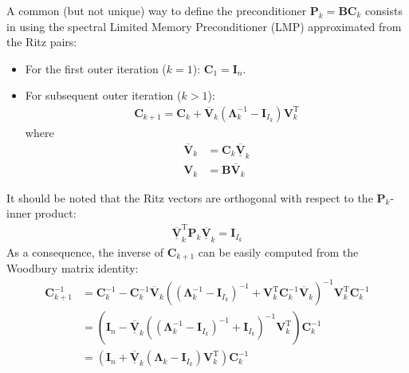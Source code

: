 \documentclass[12pt]{scrartcl}
\begin{document}
A common (but not unique) way to define the preconditioner $\mathbf{P}_k = \mathbf{B}\mathbf{C}_k$ consists in using the spectral Limited Memory Preconditioner (LMP) approximated from the Ritz pairs:
\begin{itemize}
\item For the first outer iteration ($k=1$): $\mathbf{C}_1 = \mathbf{I}_n$.
\item For subsequent outer iteration ($k>1$):
\begin{align}
\mathbf{C}_{k+1} = \mathbf{C}_k + \overline{\mathbf{V}}_k \left(\mathbf{\Lambda}_k^{-1} - \mathbf{I}_{I_k}\right) \mathbf{V}_k^\mathrm{T}
\end{align}
where
\begin{align}
\overline{\mathbf{V}}_k & = \mathbf{C}_k \underline{\overline{\mathbf{V}}}_k \\
\mathbf{V}_k & = \mathbf{B} \overline{\mathbf{V}}_k
\end{align}
\end{itemize}
It should be noted that the Ritz vectors are orthogonal with respect to the $\mathbf{P}_k$-inner product:
\begin{align}
\underline{\overline{\mathbf{V}}}_k^\mathrm{T} \mathbf{P}_k \underline{\overline{\mathbf{V}}}_k = \mathbf{I}_{I_k}
\end{align}
As a consequence, the inverse of $\mathbf{C}_{k+1}$ can be easily computed from the Woodbury matrix identity:
\begin{align}
\mathbf{C}_{k+1}^{-1} & = \mathbf{C}_k^{-1} - \mathbf{C}_k^{-1} \overline{\mathbf{V}}_k \left(\left(\mathbf{\Lambda}_k^{-1} - \mathbf{I}_{I_k}\right)^{-1}+\mathbf{V}_k^\mathrm{T} \mathbf{C}_k^{-1} \overline{\mathbf{V}}_k\right)^{-1} \mathbf{V}_k^\mathrm{T} \mathbf{C}_k^{-1} \nonumber \\
& = \left(\mathbf{I}_n-\underline{\overline{\mathbf{V}}}_k \left(\left(\mathbf{\Lambda}_k^{-1} - \mathbf{I}_{I_k}\right)^{-1}+\mathbf{I}_{I_k}\right)^{-1} \mathbf{V}_k^\mathrm{T}\right)\mathbf{C}_k^{-1} \nonumber \\
& = \left(\mathbf{I}_n+\underline{\overline{\mathbf{V}}}_k \left(\mathbf{\Lambda}_k-\mathbf{I}_{I_k}\right) \mathbf{V}_k^\mathrm{T}\right)\mathbf{C}_k^{-1}
\end{align}
\end{document}
